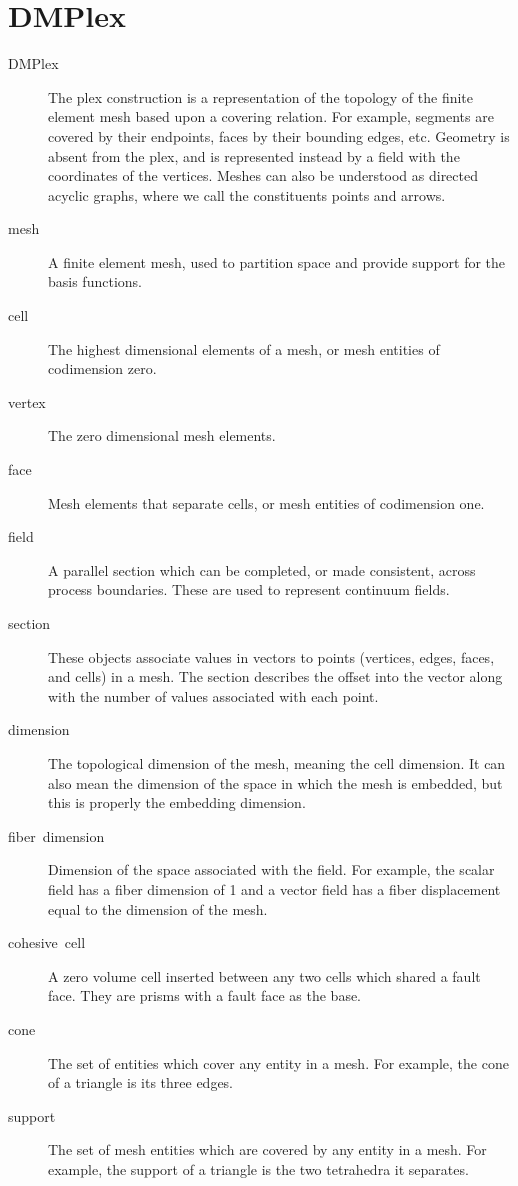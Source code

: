 \section{DMPlex}
\begin{description}
\item [{DMPlex}] The plex construction is a representation of the topology
of the finite element mesh based upon a covering relation. For example,
segments are covered by their endpoints, faces by their bounding edges,
etc. Geometry is absent from the plex, and is represented instead
by a  field with the coordinates of the vertices. Meshes can also
be understood as directed acyclic graphs, where we call the constituents
points and arrows.
\item [{mesh}] A finite element mesh, used to partition space and provide
support for the basis functions.
\item [{cell}] The highest dimensional elements of a mesh, or mesh entities
of codimension zero.
\item [{vertex}] The zero dimensional mesh elements.
\item [{face}] Mesh elements that separate cells, or mesh entities of codimension
one.
\item [{field}] A parallel section which can be completed, or made consistent,
across process boundaries. These are used to represent continuum fields.
\item [{section}] These objects associate values in vectors to points (vertices,
 edges, faces, and cells) in a mesh. The section describes the offset
 into the vector along with the number of values associated with each
point.
\item [{dimension}] The topological dimension of the mesh, meaning the
cell dimension. It can also mean the dimension of the space in which
the mesh is embedded, but this is properly the embedding dimension.
\item [{fiber\ dimension}] Dimension of the space associated with the
field. For example, the scalar field has a fiber dimension of 1 and
a vector field has a fiber displacement equal to the dimension of
the mesh.
\item [{cohesive\ cell}] A zero volume cell inserted between any two cells
which shared a fault face. They are prisms with a fault face as the
base.
\item [{cone}] The set of entities which cover any entity in a mesh. For
example, the cone of a triangle is its three edges.
\item [{support}] The set of mesh entities which are covered by any entity
in a mesh. For example, the support of a triangle is the two tetrahedra
it separates.
\end{description}

